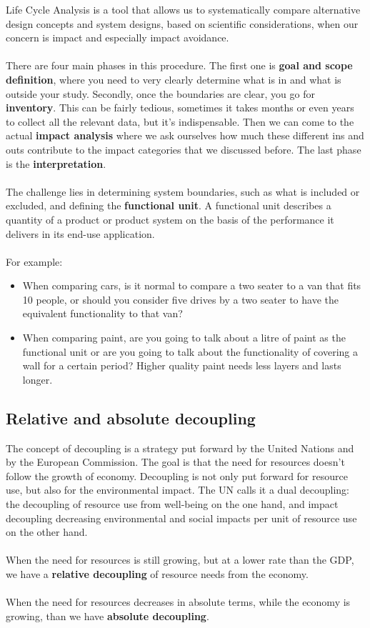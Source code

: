 \documentclass[../summary.tex]{subfiles}
\begin{document}
Life Cycle Analysis is a tool that allows us to systematically compare alternative design concepts and system designs, based on scientific considerations, when our concern is impact and especially impact avoidance.
\\\\
There are four main phases in this procedure. The first one is \textbf{goal and scope definition}, where you need to very clearly determine what is in and what is outside your study. Secondly, once the boundaries are clear, you go for \textbf{inventory}. This can be fairly tedious, sometimes it takes months or even years to collect all the relevant data, but it's indispensable. Then we can come to the actual \textbf{impact analysis} where we ask ourselves how much these different ins and outs contribute to the impact categories that we discussed before. The last phase is the \textbf{interpretation}.
\\\\
The challenge lies in determining system boundaries, such as what is included or excluded, and defining the \textbf{functional unit}. A functional unit describes a quantity of a product or product system on the basis of the performance it delivers in its end-use application.
\\\\
For example:
\begin{itemize}
	\item When comparing cars, is it normal to compare a two seater to a van that fits 10 people, or should you consider five drives by a two seater to have the equivalent functionality to that van?
	\item When comparing paint, are you going to talk about a litre of paint as the functional unit or are you going to talk about the functionality of covering a wall for a certain period? Higher quality paint needs less layers and lasts longer.
\end{itemize}


\subsection{Relative and absolute decoupling}

The concept of decoupling is a strategy put forward by the United Nations and by the European Commission. The goal is that the need for resources doesn't follow the growth of economy. Decoupling is not only put forward for resource use, but also for the environmental impact. The UN calls it a dual decoupling: the decoupling of resource use from well-being on the one hand, and impact decoupling decreasing environmental and social impacts per unit of resource use on the other hand.
\\\\
When the need for resources is still growing, but at a lower rate than the GDP, we have a \textbf{relative decoupling} of resource needs from the economy.
\\\\
When the need for resources decreases in absolute terms, while the economy is growing, than we have \textbf{absolute decoupling}.
\end{document}
